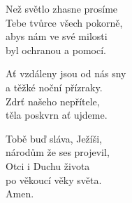 \begin{translatioMulticol}{3}
Než světlo zhasne prosíme\\
Tebe tvůrce všech pokorně,\\
abys nám ve své milosti\\
byl ochranou a pomocí.\columnbreak

Ať vzdáleny jsou od nás sny\\
a těžké noční přízraky.\\
Zdrť našeho nepřítele,\\
těla poskvrn ať ujdeme.\columnbreak

Tobě buď sláva, Ježíši,\\
národům že ses projevil,\\
Otci i Duchu života\\
po věkoucí věky světa.\\
Amen.
\end{translatioMulticol}
